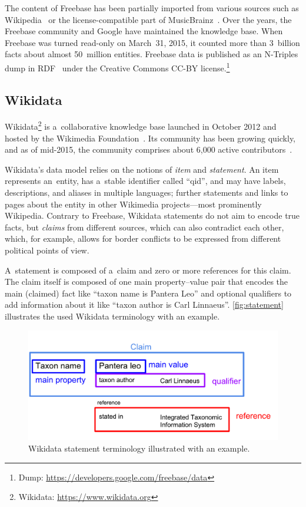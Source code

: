 \documentclass{sig-alternate-2013}
\begin{document}
The content of Freebase has been partially imported from various sources
such as Wikipedia~\cite{wikipedia-works} or
the license-compa\-tible part of MusicBrainz~\cite{musicbrainz}.
Over the years, the Freebase community and Google have maintained the knowledge base.
When Freebase was turned read-only on March~31, 2015,
it counted more than 3~billion facts about almost 50~million entities.
Freebase data is published as an N-Triples dump in RDF~\cite{rdf} under
the Creative Commons CC-BY license.\footnote{Dump: \url{https://developers.google.com/freebase/data}}

\subsection{Wikidata}

Wikidata\footnote{Wikidata: \url{https://www.wikidata.org}}
is a~collaborative knowledge base
launched in October 2012 and hosted by the Wikimedia Foundation~\cite{vrandevcic2014wikidata}.
Its community has been growing quickly, and as of mid-2015,
the community comprises about 6,000 active contributors~\cite{wikidatastats}.

Wikidata's data model relies on the notions of \emph{item} and \emph{statement}.
An item represents an~entity, has a~stable identifier called ``qid'', and may have labels,
descriptions, and aliases in multiple languages; further statements and links to pages
about the entity in other Wikimedia projects---most prominently Wikipedia.
Contrary to Freebase, Wikidata statements do not aim to encode true facts,
but \emph{claims} from different sources, which can also contradict each other,
which, for example, allows for border conflicts to be expressed
from different political points of view.

A~statement is composed of a~claim and zero or more references for this claim.
The claim itself is composed of one main property--value pair that encodes
the main (claimed) fact like ``taxon name is Pantera Leo'' and optional qualifiers
to add information about it like ``taxon author is Carl Linnaeus''.
\autoref{fig:statement} illustrates the used Wikidata terminology with an example.

\begin{figure}[!htbp]
  \centering
  \includegraphics[width=8.45 cm]{img/wikidata-statement-schema.pdf}
  \caption{Wikidata statement terminology illustrated with an example.}
  \label{fig:statement}
\end{figure}
\end{document}
